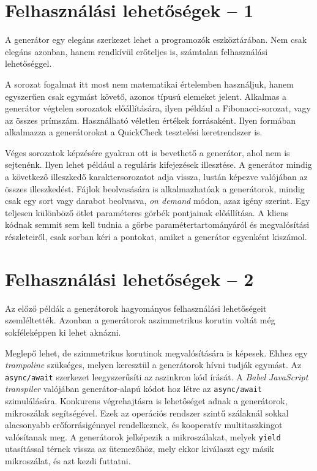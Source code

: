 \documentclass[12pt, a4paper]{article}
\begin{document}
\section{Felhasználási lehetőségek -- 1}

A generátor egy elegáns szerkezet lehet a programozók eszköztárában. Nem csak elegáns azonban, hanem rendkívül erőteljes is, számtalan felhasználási lehetőséggel.

A sorozat fogalmat itt most nem matematikai értelemben használjuk, hanem egyszerűen csak egymást követő, azonos típusú elemeket jelent. Alkalmas a generátor végtelen sorozatok előállítására, ilyen például a Fibonacci-sorozat, vagy az összes prímszám. Használható véletlen értékek forrásaként. Ilyen formában alkalmazza a generátorokat a QuickCheck tesztelési keretrendszer is.

Véges sorozatok képzésére gyakran ott is bevethető a generátor, ahol nem is sejtenénk. Ilyen lehet például a reguláris kifejezések illesztése. A generátor mindig a következő illeszkedő karaktersorozatot adja vissza, lustán képezve valójában az összes illeszkedést. Fájlok beolvasására is alkalmazhatóak a generátorok, mindig csak egy sort vagy darabot beolvasva, \textit{on demand} módon, azaz igény szerint. Egy teljesen különböző ötlet paraméteres görbék pontjainak előállítása. A kliens kódnak semmit sem kell tudnia a görbe paramétertartományáról és megvalósítási részleteiről, csak sorban kéri a pontokat, amiket a generátor egyenként kiszámol.

\section{Felhasználási lehetőségek -- 2}

Az előző példák a generátorok hagyományos felhasználási lehetőségeit szemléltették. Azonban a generátorok aszimmetrikus korutin voltát még sokféleképpen ki lehet aknázni.

Meglepő lehet, de szimmetrikus korutinok megvalósítására is képesek. Ehhez egy \textit{trampoline} szükséges, melyen keresztül a generátorok hívni tudják egymást. Az \texttt{async/await} szerkezet leegyszerűsíti az aszinkron kód írását. A \textit{Babel} \textit{JavaScript} \textit{transpiler} valójában generátor-alapú kódot hoz létre az \texttt{async/await} szimulálására. Konkurens végrehajtásra is lehetőséget adnak a generátorok, mikroszálak segítségével. Ezek az operációs rendszer szintű szálaknál sokkal alacsonyabb erőforrásigénnyel rendelkeznek, és kooperatív multitaszkingot valósítanak meg. A generátorok jelképezik a mikroszálakat, melyek \texttt{yield} utasítással térnek vissza az ütemezőhöz, mely ekkor kiválaszt egy másik mikroszálat, és azt kezdi futtatni.
\end{document}
